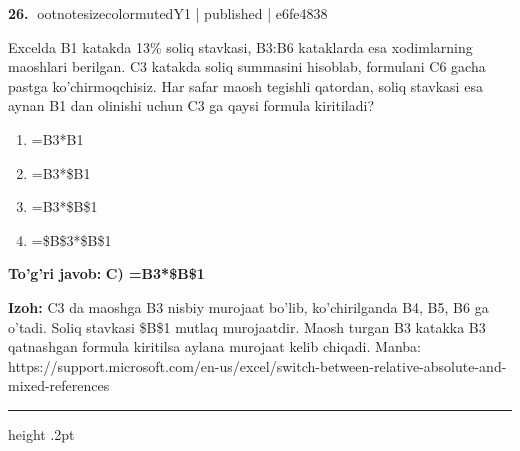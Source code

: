 \documentclass[10pt,a4paper]{article}
\begin{document}
\textbf{\color{ink}26.} {ootnotesizecolor{muted}Y1 | published | e6fe4838}
\par
Excelda B1 katakda 13\% soliq stavkasi, B3:B6 kataklarda esa xodimlarning maoshlari berilgan. C3 katakda soliq summasini hisoblab, formulani C6 gacha pastga ko'chirmoqchisiz. Har safar maosh tegishli qatordan, soliq stavkasi esa aynan B1 dan olinishi uchun C3 ga qaysi formula kiritiladi?
\begin{enumerate}[label=\Alph*),leftmargin=9mm]
\item =B3*B1
\item =B3*\$B1
\item =B3*\$B\$1
\item =\$B\$3*\$B\$1
\end{enumerate}
\begin{tcolorbox}[enhanced,breakable,colback=teal!4,colframe=teal!55!black,boxrule=0.45pt,arc=1.2mm,left=2.8mm,right=2.8mm,top=2mm,bottom=2mm]
\textbf{\color{teal}To'g'ri javob:} \textbf{C) =B3*\$B\$1}
\par\smallskip
\textbf{Izoh:} C3 da maoshga B3 nisbiy murojaat bo'lib, ko'chirilganda B4, B5, B6 ga o'tadi. Soliq stavkasi \$B\$1 mutlaq murojaatdir. Maosh turgan B3 katakka B3 qatnashgan formula kiritilsa aylana murojaat kelib chiqadi. \newline Manba: https://support.microsoft.com/en-us/excel/switch-between-relative-absolute-and-mixed-references
\end{tcolorbox}
\vspace{2mm}\hrule height .2pt\vspace{2mm}
\end{document}
